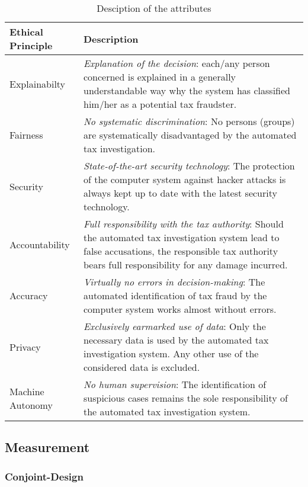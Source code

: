 \documentclass{article}
\begin{document}
\begin{table}

\caption{\label{tab:unnamed-chunk-2}Desciption of the attributes}
\centering
\begin{tabular}[t]{l>{\raggedright\arraybackslash}p{35em}}
\toprule
Ethical Principle & Description\\
\midrule
Explainabilty & \emph{Explanation of the decision}: each/any person concerned is explained in a generally understandable way why the system has classified him/her as a potential tax fraudster.\\
Fairness & \emph{No systematic discrimination}: No persons (groups) are systematically disadvantaged by the automated tax investigation.\\
Security & \emph{State-of-the-art security technology}: The protection of the computer system against hacker attacks is always kept up to date with the latest security technology.\\
Accountability & \emph{Full responsibility with the tax authority}: Should the automated tax investigation system lead to false accusations, the responsible tax authority bears full responsibility for any damage incurred.\\
Accuracy & \emph{Virtually no errors in decision-making}: The automated identification of tax fraud by the computer system works almost without errors.\\
\addlinespace
Privacy & \emph{Exclusively earmarked use of data}: Only the necessary data is used by the automated tax investigation system. Any other use of the considered data is excluded.\\
Machine Autonomy & \emph{No human supervision}: The identification of suspicious cases remains the sole responsibility of the automated tax investigation system.\\
\bottomrule
\end{tabular}
\end{table}

\hypertarget{measurement}{%
\subsection{Measurement}\label{measurement}}

\hypertarget{conjoint-design}{%
\subsubsection{Conjoint-Design}\label{conjoint-design}}
\end{document}
